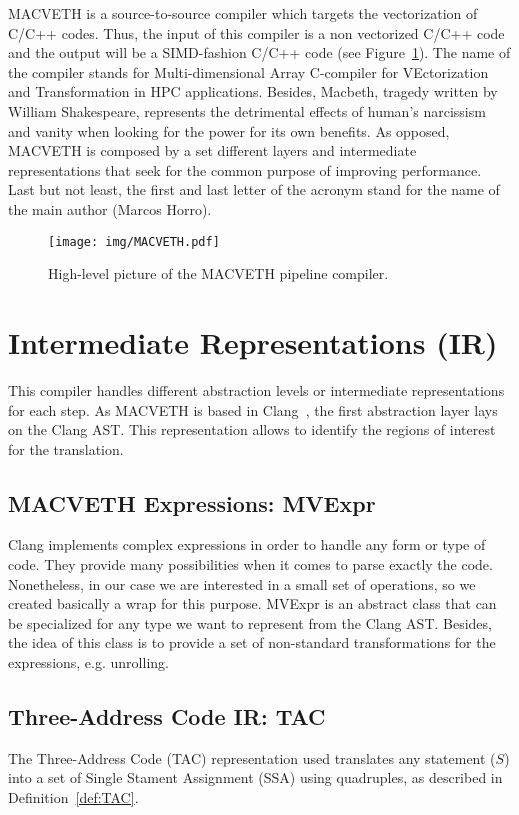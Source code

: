 \documentclass[a4paper,12pt]{memoir}
\begin{document}
MACVETH is a source-to-source compiler which targets the vectorization of C/C++ 
codes. Thus, the input of this compiler is a non vectorized C/C++ code and the 
output will be a SIMD-fashion C/C++ code (see Figure~\ref{fig:MACVETHarch}). 
The name of the compiler stands for Multi-dimensional Array C-compiler for 
VEctorization and Transformation in HPC applications. Besides, Macbeth, tragedy 
written by William Shakespeare, represents the detrimental effects of human's 
narcissism and vanity when looking for the power for its own benefits. As 
opposed, MACVETH is composed by a set different layers and intermediate 
representations that seek for the common purpose of improving performance. Last 
but not least, the first and last letter of the acronym stand for the name of 
the main author (Marcos Horro).

\begin{figure}
	\centering
	\texttt{[image: img/MACVETH.pdf]}
	\caption{High-level picture of the MACVETH pipeline compiler.}
	\label{fig:MACVETHarch}
\end{figure}

\chapter{Intermediate Representations (IR)}



This compiler handles different abstraction levels or intermediate
representations for each step. As MACVETH is based in Clang~\cite{bib:clang},
the first abstraction layer lays on the Clang AST. This representation allows to
identify the regions of interest for the translation.

\section{MACVETH Expressions: MVExpr}
Clang implements complex expressions in order to handle any form or type of 
code. They 
provide many possibilities
when it comes to parse exactly the code. Nonetheless, in our case we are
interested in a small set of operations, so we created basically a wrap for this
purpose. MVExpr is an abstract class that can be specialized for any type we
want to represent from the Clang AST. Besides, the idea of this class is to
provide a set of non-standard transformations for the expressions, e.g.
unrolling.

\section{Three-Address Code IR: TAC}
The Three-Address Code (TAC) representation used translates any statement ($S$) 
into a
set of Single Stament Assignment (SSA) using quadruples, as described in 
Definition~\ref{def:TAC}.
\end{document}
